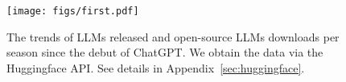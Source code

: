 \begin{figure}[t]
\centering
\texttt{[image: figs/first.pdf]}
\caption{The trends of LLMs released and open-source LLMs downloads per season since the debut of ChatGPT. We obtain the data via the Huggingface API. See details in Appendix~\ref{sec:huggingface}.}
\vspace{-11pt}
\label{fig:abs}
\end{figure}
% 





